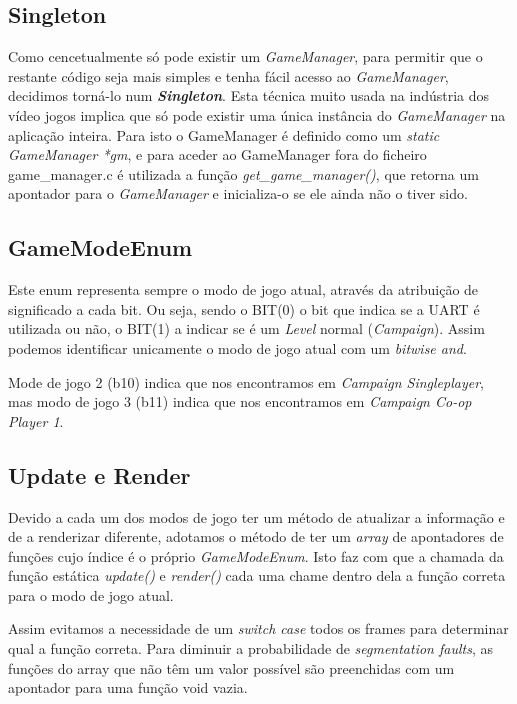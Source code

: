 \documentclass{report}
\begin{document}
\subsection{Singleton}

Como cencetualmente só pode existir um \textit{GameManager}, para permitir que o restante código seja mais simples e tenha fácil acesso ao \textit{GameManager}, decidimos torná-lo num \textbf{\textit{Singleton}}. Esta técnica muito usada na indústria dos vídeo jogos implica que só pode existir uma única instância do \textit{GameManager} na aplicação inteira. Para isto o GameManager é definido como um \textit{static GameManager *gm}, e para aceder ao GameManager fora do ficheiro game\_manager.c é utilizada a função \textit{get\_game\_manager()}, que retorna um apontador para o \textit{GameManager} e inicializa-o se ele ainda não o tiver sido.

\subsection{GameModeEnum}

Este enum representa sempre o modo de jogo atual, através da atribuição de significado a cada bit. Ou seja, sendo o BIT(0) o bit que indica se a UART é utilizada ou não, o BIT(1) a indicar se é um \textit{Level} normal (\textit{Campaign}). Assim podemos identificar unicamente o modo de jogo atual com um \textit{bitwise and}.

Mode de jogo 2 (b10) indica que nos encontramos em \textit{Campaign Singleplayer}, mas modo de jogo 3 (b11) indica que nos encontramos em \textit{Campaign Co-op Player 1}.

\subsection{Update e Render}

Devido a cada um dos modos de jogo ter um método de atualizar a informação e de a renderizar diferente, adotamos o método de ter um \textit{array} de apontadores de funções cujo índice é o próprio \textit{GameModeEnum}. Isto faz com que a chamada da função estática \textit{update()} e \textit{render()} cada uma chame dentro dela a função correta para o modo de jogo atual.

Assim evitamos a necessidade de um \textit{switch case} todos os frames para determinar qual a função correta. Para diminuir a probabilidade de \textit{segmentation faults}, as funções do array que não têm um valor possível são preenchidas com um apontador para uma função void vazia.
\end{document}
